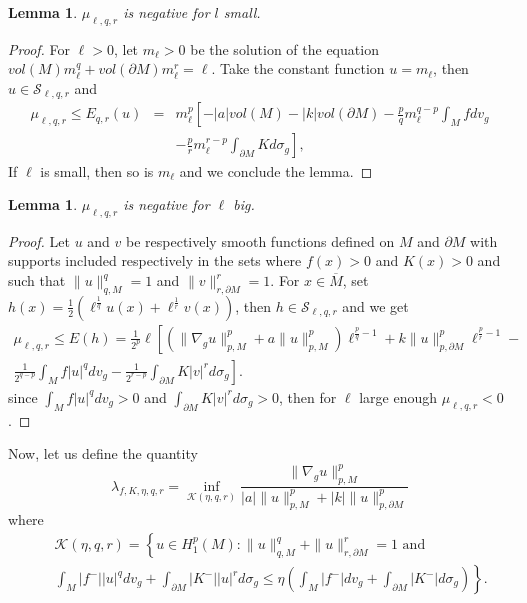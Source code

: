 \documentclass{Tran-l}
\newtheorem{lem}[thm]{Lemma}
\theoremstyle{definition}
\theoremstyle{remark}
\numberwithin{equation}{section}
\begin{document}
\begin{lem}
$\mu_{\ell,q,r}$ is negative for $l$ small.
\end{lem}
\begin{proof}
For $\ell>0$, let $m_\ell>0$ be the solution of the equation
$vol(M)m_\ell^q+vol(\partial M)m_\ell^r=\ell$. Take the constant
function $u=m_\ell$, then $u\in{\mathcal{S}}_{\ell,q,r}$ and
\begin{eqnarray*}
\mu_{\ell,q,r}\leq E_{q,r}(u)&=&
m_\ell^{p}\left[-|a|vol(M)-|k|vol(\partial
M)-\frac{p}{q}m_\ell^{q-p}\int_M fdv_g\right.\\&&
\left.-\frac{p}{r}m_\ell^{r-p}\int_{\partial M}Kd\sigma_g\right],
\end{eqnarray*}
If $\ell$ is small, then so is $m_\ell$ and we conclude the lemma.
\end{proof}
\begin{lem}$\mu_{\ell,q,r}$ is negative for $\ell$ big.
\end{lem}
\begin{proof}
Let $u$ and $v$  be respectively smooth functions defined on $M$ and
$\partial M$ with supports included respectively in the sets where
$f(x)>0$ and $K(x)>0$ and such that $\|u\|_{q,M}^q=1$ and
$\|v\|_{r,\partial M}^r=1$. For $x\in \overline M$, set
$h(x)=\frac{1}{2}(\ell^\frac{1}{q}u(x)+\ell^\frac{1}{r}v(x))$, then
$h\in{\mathcal{S}}_{\ell,q,r}$ and we get\\
\begin{eqnarray*}
\mu_{\ell,q,r}\leq E(h)=\frac{1}{2^p}\ell\left[
\left(\|\nabla_gu\|^p_{p,M}+a\|u\|_{p,M}^p\right)\ell^{\frac{p}{q}-1}+
k\|u\|_{p,\partial M}^p\ell^{\frac{p}{r}-1}-\right.&&\\ \left.
\frac{1}{2^{q-p}}\int_Mf|u|^qdv_g-\frac{1}{2^{r-p}}\int_{\partial
M}K|v|^rd\sigma_g\right].&&
\end{eqnarray*}
since $\int_Mf|u|^qdv_g>0$ and $\int_{\partial M}K|v|^rd\sigma_g>0$,
then for $\ell$ large enough $\mu_{\ell,q,r}<0$.
\end{proof}
Now, let us define the quantity
\begin{equation*}
\lambda_{f,K,\eta,q,r}=\inf_{{\mathcal{K}}(\eta,q,r)}
\frac{\|\nabla_gu\|^p_{p,M}}{|a|\|u\|_{p,M}^p+|k|\|u\|_{p,\partial
M}^p}
\end{equation*}
where
\begin{eqnarray*}
&&{\mathcal{K}}(\eta,q,r)=\left\{u\in H_1^p(M):\|u\|_{q,M}^q+\|u\|_{r,\partial
M}^r=1 \text{ and }\right.\\&& \int_M|f^-||u|^qdv_g+\int_{\partial
M}|K^-||u|^rd\sigma_g \left.\leq\eta\left(\int_M|f^-|dv_g
+\int_{\partial M}|K^-|d\sigma_g\right)\right\}.
\end{eqnarray*}
\end{document}
